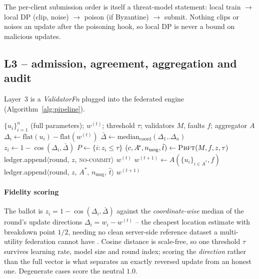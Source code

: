 The per-client submission order is itself a threat-model statement:
local train $\rightarrow$ local DP (clip, noise) $\rightarrow$ poison
(if Byzantine) $\rightarrow$ submit. Nothing clips or noises an update
after the poisoning hook, so local DP is never a bound on malicious
updates.

\subsection{L3 -- admission, agreement, aggregation and audit}
\label{sec:l3}

Layer~3 is a \emph{ValidatorFn} plugged into the federated engine
(Algorithm~\ref{alg:pipeline}).

\begin{algorithm}[tbp]
\caption{One \sysname{} validation round}
\label{alg:pipeline}
\small
\begin{algorithmic}[1]
\Require $\{u_i\}_{i=1}^{n}$ (full parameters); $w^{(t)}$; threshold $\tau$;
  validators $M$, faults $f$; aggregator $A$
\State $\Delta_i \gets \mathrm{flat}(u_i) - \mathrm{flat}(w^{(t)})$
\State $\bar{\Delta} \gets \mathrm{median}_{\mathrm{coord}}(\Delta_1..\Delta_n)$
\State $z_i \gets 1 - \cos(\Delta_i, \bar{\Delta})$
\State $P \gets \{ i : z_i \le \tau \}$ 
\State $(c, A^{\!*}, n_{\mathrm{msg}}, \hat{t}) \gets
  \textsc{Pbft}(M, f, z, \tau)$ 
  \State ledger.append$\langle$round, $z$, \textsc{no-commit}$\rangle$
  \State \Return $w^{(t)}$ 
\EndIf
\State $w^{(t+1)} \gets A(\{u_i\}_{i\in A^{\!*}}, f)$
\State ledger.append$\langle$round, $z$, $A^{\!*}$, $n_{\mathrm{msg}}$,
  $\hat{t}\rangle$ 
\State \Return $w^{(t+1)}$ 
\end{algorithmic}
\end{algorithm}

\paragraph{Fidelity scoring}
The ballot is $z_i = 1-\cos(\Delta_i, \bar{\Delta})$ against the
\emph{coordinate-wise} median of the round's update directions
$\Delta_i = w_i - w^{(t)}$ -- the cheapest location estimate with
breakdown point $1/2$, needing no clean server-side reference dataset a
multi-utility federation cannot have \cite{cao2021fltrust}. Cosine
distance is scale-free, so one threshold $\tau$ survives learning rate,
model size and round index; scoring the \emph{direction} rather than the
full vector is what separates an exactly reversed update from an honest
one. Degenerate cases score the neutral $1.0$.

